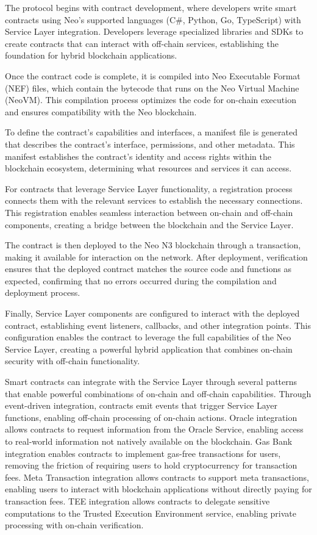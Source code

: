 \documentclass[11pt]{article}
\begin{document}
The protocol begins with contract development, where developers write smart contracts using Neo's supported languages (C\#, Python, Go, TypeScript) with Service Layer integration. Developers leverage specialized libraries and SDKs to create contracts that can interact with off-chain services, establishing the foundation for hybrid blockchain applications.

Once the contract code is complete, it is compiled into Neo Executable Format (NEF) files, which contain the bytecode that runs on the Neo Virtual Machine (NeoVM). This compilation process optimizes the code for on-chain execution and ensures compatibility with the Neo blockchain.

To define the contract's capabilities and interfaces, a manifest file is generated that describes the contract's interface, permissions, and other metadata. This manifest establishes the contract's identity and access rights within the blockchain ecosystem, determining what resources and services it can access.

For contracts that leverage Service Layer functionality, a registration process connects them with the relevant services to establish the necessary connections. This registration enables seamless interaction between on-chain and off-chain components, creating a bridge between the blockchain and the Service Layer.

The contract is then deployed to the Neo N3 blockchain through a transaction, making it available for interaction on the network. After deployment, verification ensures that the deployed contract matches the source code and functions as expected, confirming that no errors occurred during the compilation and deployment process.

Finally, Service Layer components are configured to interact with the deployed contract, establishing event listeners, callbacks, and other integration points. This configuration enables the contract to leverage the full capabilities of the Neo Service Layer, creating a powerful hybrid application that combines on-chain security with off-chain functionality.

Smart contracts can integrate with the Service Layer through several patterns that enable powerful combinations of on-chain and off-chain capabilities. Through event-driven integration, contracts emit events that trigger Service Layer functions, enabling off-chain processing of on-chain actions. Oracle integration allows contracts to request information from the Oracle Service, enabling access to real-world information not natively available on the blockchain. Gas Bank integration enables contracts to implement gas-free transactions for users, removing the friction of requiring users to hold cryptocurrency for transaction fees. Meta Transaction integration allows contracts to support meta transactions, enabling users to interact with blockchain applications without directly paying for transaction fees. TEE integration allows contracts to delegate sensitive computations to the Trusted Execution Environment service, enabling private processing with on-chain verification.
\end{document}
